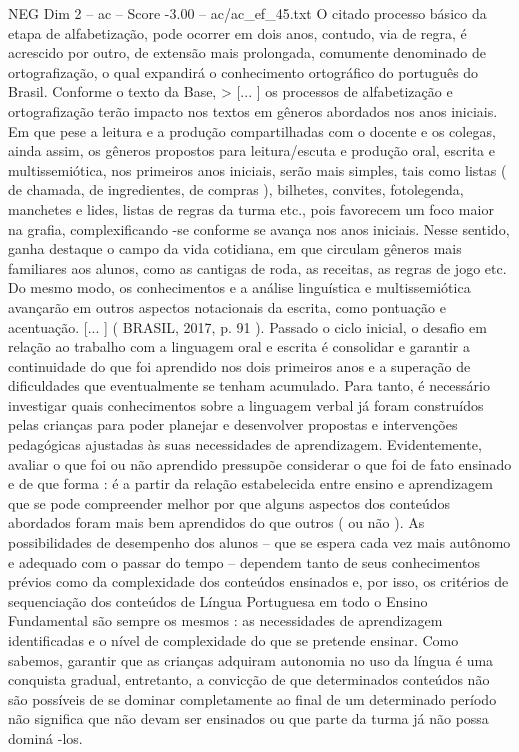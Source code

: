 \begin{textsample}{NEG Dim 2 – ac – Score -3.00 – ac/ac\_ef\_45.txt}
O citado processo básico da etapa de alfabetização, pode ocorrer em dois anos, contudo, via de regra, é acrescido por outro, de extensão mais prolongada, comumente denominado de ortografização, o qual expandirá o conhecimento ortográfico do português do Brasil.
Conforme o texto da Base, > [... ] os processos de alfabetização e ortografização terão impacto nos textos em gêneros abordados nos anos iniciais.
Em que pese a leitura e a produção compartilhadas com o docente e os colegas, ainda assim, os gêneros propostos para leitura/escuta e produção oral, escrita e multissemiótica, nos primeiros anos iniciais, serão mais simples, tais como listas ( de chamada, de ingredientes, de compras ), bilhetes, convites, fotolegenda, manchetes e lides, listas de regras da turma etc., pois favorecem um foco maior na grafia, complexificando -se conforme se avança nos anos iniciais.
Nesse sentido, ganha destaque o campo da vida cotidiana, em que circulam gêneros mais familiares aos alunos, como as cantigas de roda, as receitas, as regras de jogo etc.
Do mesmo modo, os conhecimentos e a análise linguística e multissemiótica avançarão em outros aspectos notacionais da escrita, como pontuação e acentuação. [... ] ( BRASIL, 2017, p. 91 ).
Passado o ciclo inicial, o desafio em relação ao trabalho com a linguagem oral e escrita é consolidar e garantir a continuidade do que foi aprendido nos dois primeiros anos e a superação de dificuldades que eventualmente se tenham acumulado.
Para tanto, é necessário investigar quais conhecimentos sobre a linguagem verbal já foram construídos pelas crianças para poder planejar e desenvolver propostas e intervenções pedagógicas ajustadas às suas necessidades de aprendizagem.
Evidentemente, avaliar o que foi ou não aprendido pressupõe considerar o que foi de fato ensinado e de que forma : é a partir da relação estabelecida entre ensino e aprendizagem que se pode compreender melhor por que alguns aspectos dos conteúdos abordados foram mais bem aprendidos do que outros ( ou não ).
As possibilidades de desempenho dos alunos – que se espera cada vez mais autônomo e adequado com o passar do tempo – dependem tanto de seus conhecimentos prévios como da complexidade dos conteúdos ensinados e, por isso, os critérios de sequenciação dos conteúdos de Língua Portuguesa em todo o Ensino Fundamental são sempre os mesmos : as necessidades de aprendizagem identificadas e o nível de complexidade do que se pretende ensinar.
Como sabemos, garantir que as crianças adquiram autonomia no uso da língua é uma conquista gradual, entretanto, a convicção de que determinados conteúdos não são possíveis de se dominar completamente ao final de um determinado período não significa que não devam ser ensinados ou que parte da turma já não possa dominá -los.

\end{textsample}

